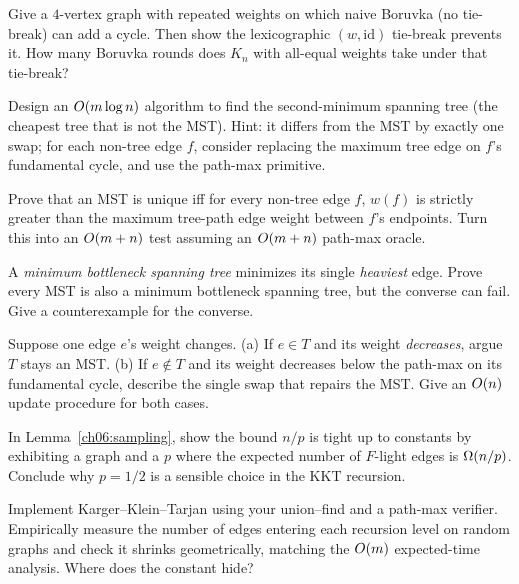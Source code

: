 \begin{exercise}
Give a $4$-vertex graph with repeated weights on which naive Boruvka (no tie-break) can add a cycle. Then show the lexicographic $(w,\text{id})$ tie-break prevents it. How many Boruvka rounds does $K_n$ with all-equal weights take under that tie-break?
\end{exercise}

\begin{exercise}
Design an $O(m\log n)$ algorithm to find the second-minimum spanning tree (the cheapest tree that is not the MST). Hint: it differs from the MST by exactly one swap; for each non-tree edge $f$, consider replacing the maximum tree edge on $f$'s fundamental cycle, and use the path-max primitive.
\end{exercise}

\begin{exercise}
Prove that an MST is unique iff for every non-tree edge $f$, $w(f)$ is strictly greater than the maximum tree-path edge weight between $f$'s endpoints. Turn this into an $O(m+n)$ test assuming an $O(m+n)$ path-max oracle.
\end{exercise}

\begin{exercise}
A \emph{minimum bottleneck spanning tree} minimizes its single \emph{heaviest} edge. Prove every MST is also a minimum bottleneck spanning tree, but the converse can fail. Give a counterexample for the converse.
\end{exercise}

\begin{exercise}
Suppose one edge $e$'s weight changes. (a) If $e\in T$ and its weight \emph{decreases}, argue $T$ stays an MST. (b) If $e\notin T$ and its weight decreases below the path-max on its fundamental cycle, describe the single swap that repairs the MST. Give an $O(n)$ update procedure for both cases.
\end{exercise}

\begin{exercise}
In Lemma~\ref{ch06:sampling}, show the bound $n/p$ is tight up to constants by exhibiting a graph and a $p$ where the expected number of $F$-light edges is $\Omega(n/p)$. Conclude why $p=1/2$ is a sensible choice in the KKT recursion.
\end{exercise}

\begin{exercise}
Implement Karger--Klein--Tarjan using your union--find and a path-max verifier. Empirically measure the number of edges entering each recursion level on random graphs and check it shrinks geometrically, matching the $O(m)$ expected-time analysis. Where does the constant hide?
\end{exercise}


